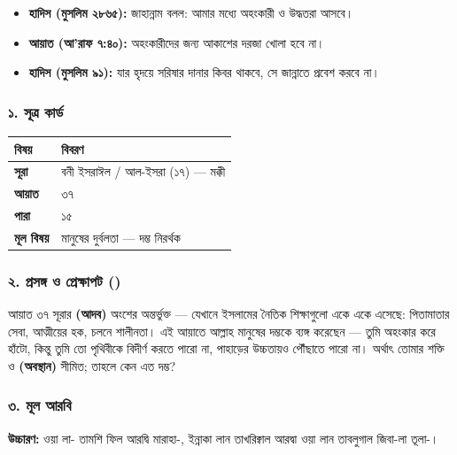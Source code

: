 \begin{itemize}
\item \textbf{হাদিস (মুসলিম ২৮৬৫):} জাহান্নাম বলল: আমার মধ্যে অহংকারী ও উদ্ধতরা আসবে।
\item \textbf{আয়াত (আ'রাফ ৭:৪০):} অহংকারীদের জন্য আকাশের দরজা খোলা হবে না।
\item \textbf{হাদিস (মুসলিম ৯১):} যার হৃদয়ে সরিষার দানার কিবর থাকবে, সে জান্নাতে প্রবেশ করবে না।
\end{itemize}
\subsubsection*{১. সূত্র কার্ড}

\begin{table}[h]\centering\small
\begin{tabular}{ll}
বিষয় & বিবরণ \\
\hline
\textbf{সূরা} & বনী ইসরাঈল / আল-ইসরা (১৭) — মক্কী \\
\textbf{আয়াত} & ৩৭ \\
\textbf{পারা} & ১৫ \\
\textbf{মূল বিষয়} & মানুষের দুর্বলতা — দম্ভ নিরর্থক \\
\hline
\end{tabular}
\end{table}

\subsubsection*{২. প্রসঙ্গ ও প্রেক্ষাপট ()}

আয়াত ৩৭ সূরার \textbf{ (আদব)} অংশের অন্তর্ভুক্ত — যেখানে ইসলামের নৈতিক শিক্ষাগুলো একে একে এসেছে: পিতামাতার সেবা, আত্মীয়ের হক, চলনে শালীনতা। এই আয়াতে আল্লাহ মানুষের দম্ভকে ব্যঙ্গ করেছেন — তুমি অহংকার করে হাঁটো, কিন্তু তুমি তো পৃথিবীকে বিদীর্ণ করতে পারো না, পাহাড়ের উচ্চতায়ও পৌঁছাতে পারো না। অর্থাৎ তোমার শক্তি ও \textbf{ (অবস্থান)} সীমিত; তাহলে কেন এত দম্ভ?

\subsubsection*{৩. মূল আরবি}
\begin{center}\end{center}
\textbf{উচ্চারণ:} ওয়া লা- তামশি ফিল আরদ্বি মারাহা-, ইন্নাকা লান তাখরিক্বাল আরদ্বা ওয়া লান তাবলুগাল জিবা-লা তূলা-।

